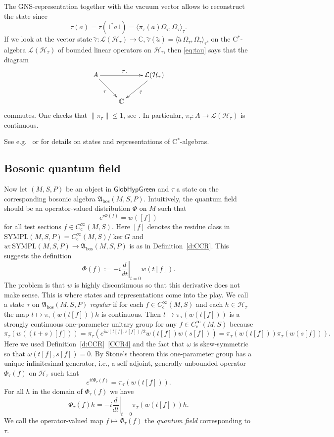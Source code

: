 \documentclass[a4paper,11pt]{amsart}
\theoremstyle{definition}
\begin{document}
The GNS-representation together with the vacuum vector allows to reconstruct the state since
\begin{equation}
\tau(a) = \tau(1^*a1) = {{\langle}{\pi_\tau(a)\Omega_\tau},{\Omega_\tau}{\rangle}_\tau} .
\label{eq:tau}
\end{equation}
If we look at the vector state $\tilde\tau:{\mathcal{L}}({\mathcal{H}}_\tau) \to {\mathbb{C}}$, $\tilde\tau(\tilde a) = {{\langle}{\tilde a\,\Omega_\tau},{\Omega_\tau}{\rangle}_\tau}$, on the {\mbox{C$^*$}}-algebra ${\mathcal{L}}({\mathcal{H}}_\tau)$ of bounded linear operators on ${\mathcal{H}}_\tau$, then \eqref{eq:tau} says that the diagram
$$
\xymatrix{
A \ar[rr]^{\pi_\tau} \ar[rd]_\tau && {\mathcal{L}}({\mathcal{H}}_\tau) \ar[ld]^{\tilde\tau}\\
& {\mathbb{C}} &
}
$$
commutes.
One checks that $\|\pi_\tau\|\le 1$, see \cite[p.~20]{BB}. 
In particular, $\pi_\tau: A \to {\mathcal{L}}({\mathcal{H}}_\tau)$ is continuous.

See e.g.\ \cite[Sec.~1.4]{BB} or \cite[Sec.~2.3]{BR} for details on states and representations of {\mbox{C$^*$}}-algebras.

\subsection{Bosonic quantum field}
Now let $(M,S,P)$ be an object in ${\mathsf{GlobHypGreen}}$ and $\tau$ a state on the corresponding bosonic algebra ${\mathfrak{A}_\mathrm{bos}}(M,S,P)$.
Intuitively, the quantum field should be an operator-valued distribution $\Phi$ on $M$ such that
$$
e^{i\Phi(f)} = w([f])
$$
for all test sections $f\in{C^\infty_\mathrm{c}}(M,S)$.
Here $[f]$ denotes the residue class in ${\mathrm{SYMPL}}(M,S,P)={C^\infty_\mathrm{c}}(M,S)/\ker G$ and $w:{\mathrm{SYMPL}}(M,S,P) \to {\mathfrak{A}_\mathrm{bos}}(M,S,P)$ is as in Definition~\ref{d:CCR}.
This suggests the definition
$$
\Phi(f) := -i{\left.\frac{d}{dt}\right|_{t=0}} w(t[f]).
$$
The problem is that $w$ is highly discontinuous so that this derivative does not make sense.
This is where states and representations come into the play.
We call a state $\tau$ on ${\mathfrak{A}_\mathrm{bos}}(M,S,P)$ {\em regular} if for each $f\in{C^\infty_\mathrm{c}}(M,S)$ and each $h\in{\mathcal{H}}_\tau$ the map $t\mapsto \pi_\tau(w(t[f]))h$ is continuous.
Then $t\mapsto \pi_\tau(w(t[f]))$ is a strongly continuous one-parameter unitary group for any $f\in{C^\infty_\mathrm{c}}(M,S)$ because
$$
\pi_\tau(w((t+s)[f])) 
= \pi_\tau(e^{i\omega(t[f],s[f])/2}w(t[f])w(s[f]))
= \pi_\tau(w(t[f]))\pi_\tau(w(s[f])) .
$$
Here we used Definition~\ref{d:CCR}~\eqref{CCR4} and the fact that $\omega$ is skew-symmetric so that $\omega(t[f],s[f])=0$.
By Stone's theorem \cite[Thm.~VIII.8]{RS1} this one-parameter group has a unique infinitesimal generator, i.e., a self-adjoint, generally unbounded operator $\Phi_\tau(f)$ on ${\mathcal{H}}_\tau$ such that 
$$
e^{it\Phi_\tau(f)} = \pi_\tau(w(t[f])) .
$$
For all $h$ in the domain of $\Phi_\tau(f)$ we have
$$
\Phi_\tau(f)h = -i{\left.\frac{d}{dt}\right|_{t=0}} \pi_\tau(w(t[f]))h .
$$
We call the operator-valued map $f \mapsto \Phi_\tau(f)$ the {\em quantum field}
corresponding to $\tau$.
\end{document}
